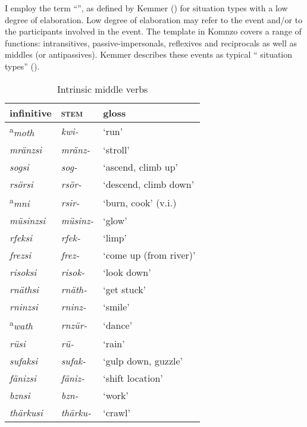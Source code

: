 I employ the term ``'', as defined by Kemmer (\citeyear[207-210]{Kemmer:1993wda}) for situation types with a low degree of elaboration. Low degree of elaboration may refer to the event and/or to the participants involved in the event. The  template in Komnzo covers a range of functions: intransitives, passive-impersonals, reflexives and reciprocals as well as  middles (or antipassives). Kemmer describes these events as typical `` situation types'' (\citeyear[15]{Kemmer:1993wda}).

\begin{table}
\caption{Intrinsic middle verbs}
\label{intrinsicmiddleverbs}
	\begin{tabularx}{\textwidth}{XXl}
		\lsptoprule
		{infinitive} & \Ext{} \textsc{stem}		& {gloss}\\  \midrule
		\textsuperscript{a}\emph{moth}		& \emph{kwi-}				& `run'\\
		\emph{mränzsi}		& \emph{mränz-}				& `stroll'\\
		\emph{sogsi}		& \emph{sog-}				& `ascend, climb up'\\
		\emph{rsörsi}		& \emph{rsör-}				& `descend, climb down'\\
		\textsuperscript{a}\emph{mni}		& \emph{rsir-}				& `burn, cook' (v.i.)\\
		\emph{müsinzsi}		& \emph{müsinz-}			& `glow'\\
		\emph{rfeksi}		& \emph{rfek-}				& `limp'\\
		\emph{frezsi}		& \emph{frez-}				& `come up (from river)'\\
		\emph{risoksi}		& \emph{risok-}				& `look down'\\
		\emph{rnäthsi}		& \emph{rnäth-}				& `get stuck'\\
		\emph{rninzsi}		& \emph{rninz-}				& `smile'\\
		\textsuperscript{a}\emph{wath}		& \emph{rnzür-}				& `dance'\\
		\emph{rüsi}			& \emph{rü-}				& `rain'\\
		\emph{sufaksi}		& \emph{sufak-}				& `gulp down, guzzle'\\
		\emph{fänizsi}		& \emph{fäniz-}				& `shift location'\\
		\emph{bznsi}		& \emph{bzn-}				& `work'\\
		\emph{thärkusi}		& \emph{thärku-}			& `crawl'\\

\end{tabularx}
\end{table}
